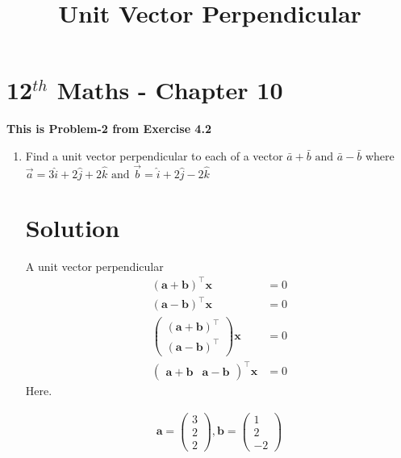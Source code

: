 \documentclass[journal,10pt,twocolumn]{article}
\newcommand{\myvec}[1]{\ensuremath{\begin{pmatrix}#1\end{pmatrix}}}
\let\vec\mathbf
\let\vec\mathbf
\begin{document}
\begin{center}
\title{\textbf{  Unit Vector Perpendicular}}
\date{\vspace{-5ex}} %
\maketitle
\end{center}
\setcounter{page}{1}
\section{12$^{th}$ Maths - Chapter 10}
\textbf{This is Problem-2 from Exercise 4.2}
\begin{enumerate}

\item Find a unit vector  perpendicular to each of a vector $\bar{a}+\bar{b} \text{ and }\bar{a}-\bar{b}$ where  $\overrightarrow{a}=3\hat{i}+2\hat{j}+2\hat{k}\text{ and }\overrightarrow{b}=\hat{i}+2\hat{j}-2\hat{k}$
\section{Solution}
A unit vector  perpendicular
\begin{align} 
(\vec{a}+\vec{b})^\top\vec{x}&=0 \\
(\vec{a}-\vec{b})^\top\vec{x}&=0\\
\myvec{(\vec{a}+\vec{b})^\top\\ (\vec{a}-\vec{b})^\top}\vec{x}&=0\\
\myvec{\vec{a}+\vec{b}& \vec{a}-\vec{b}}^\top\vec{x}&=0\label{4}
\end{align}
Here.

\begin{align}
\vec{a}=\myvec{3\\2\\2},
\vec{b}=\myvec{1\\2\\-2}
\end{align}


\end{enumerate}
\end{document}
